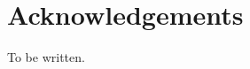 {%
\let\oldnumberline\numberline%
\renewcommand{\numberline}{\figurename~\oldnumberline}%
\listoffigures%
}

\cleardoublepage



\chapter{Acknowledgements}      %
To be written.
